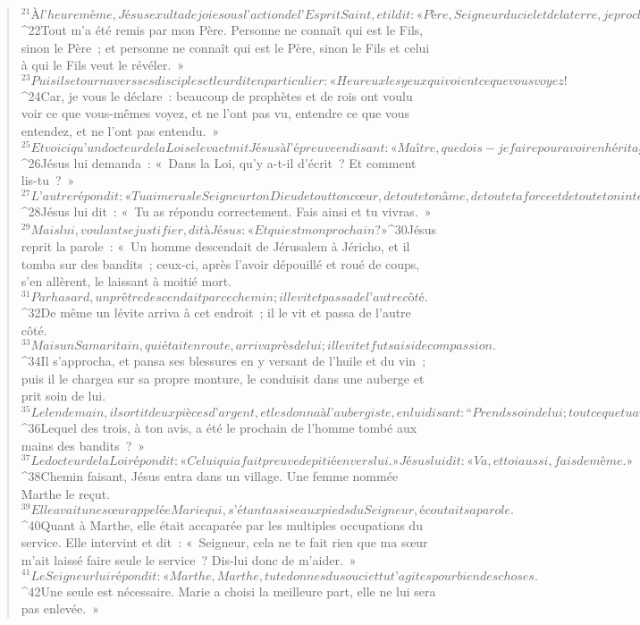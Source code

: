 \begin{verse}
${}^{21}À l’heure même, Jésus exulta de joie sous l’action de l’Esprit Saint, et il dit : « Père, Seigneur du ciel et de la terre, je proclame ta louange : ce que tu as caché aux sages et aux savants, tu l’as révélé aux tout-petits. Oui, Père, tu l’as voulu ainsi dans ta bienveillance. 
${}^{22}Tout m’a été remis par mon Père. Personne ne connaît qui est le Fils, sinon le Père ; et personne ne connaît qui est le Père, sinon le Fils et celui à qui le Fils veut le révéler. »
${}^{23}Puis il se tourna vers ses disciples et leur dit en particulier : « Heureux les yeux qui voient ce que vous voyez ! 
${}^{24}Car, je vous le déclare : beaucoup de prophètes et de rois ont voulu voir ce que vous-mêmes voyez, et ne l’ont pas vu, entendre ce que vous entendez, et ne l’ont pas entendu. »
${}^{25}Et voici qu’un docteur de la Loi se leva et mit Jésus à l’épreuve en disant : « Maître, que dois-je faire pour avoir en héritage la vie éternelle ? » 
${}^{26}Jésus lui demanda : « Dans la Loi, qu’y a-t-il d’écrit ? Et comment lis-tu ? » 
${}^{27}L’autre répondit : « Tu aimeras le Seigneur ton Dieu de tout ton cœur, de toute ton âme, de toute ta force et de toute ton intelligence, et ton prochain comme toi-même. »
${}^{28}Jésus lui dit : « Tu as répondu correctement. Fais ainsi et tu vivras. »
${}^{29}Mais lui, voulant se justifier, dit à Jésus : « Et qui est mon prochain ? »
${}^{30}Jésus reprit la parole : « Un homme descendait de Jérusalem à Jéricho, et il tomba sur des bandits ; ceux-ci, après l’avoir dépouillé et roué de coups, s’en allèrent, le laissant à moitié mort. 
${}^{31}Par hasard, un prêtre descendait par ce chemin ; il le vit et passa de l’autre côté. 
${}^{32}De même un lévite arriva à cet endroit ; il le vit et passa de l’autre côté. 
${}^{33}Mais un Samaritain, qui était en route, arriva près de lui ; il le vit et fut saisi de compassion. 
${}^{34}Il s’approcha, et pansa ses blessures en y versant de l’huile et du vin ; puis il le chargea sur sa propre monture, le conduisit dans une auberge et prit soin de lui. 
${}^{35}Le lendemain, il sortit deux pièces d’argent, et les donna à l’aubergiste, en lui disant : “Prends soin de lui ; tout ce que tu auras dépensé en plus, je te le rendrai quand je repasserai.” 
${}^{36}Lequel des trois, à ton avis, a été le prochain de l’homme tombé aux mains des bandits ? » 
${}^{37}Le docteur de la Loi répondit : « Celui qui a fait preuve de pitié envers lui. » Jésus lui dit : « Va, et toi aussi, fais de même. »
${}^{38}Chemin faisant, Jésus entra dans un village. Une femme nommée Marthe le reçut. 
${}^{39}Elle avait une sœur appelée Marie qui, s’étant assise aux pieds du Seigneur, écoutait sa parole. 
${}^{40}Quant à Marthe, elle était accaparée par les multiples occupations du service. Elle intervint et dit : « Seigneur, cela ne te fait rien que ma sœur m’ait laissé faire seule le service ? Dis-lui donc de m’aider. » 
${}^{41}Le Seigneur lui répondit : « Marthe, Marthe, tu te donnes du souci et tu t’agites pour bien des choses. 
${}^{42}Une seule est nécessaire. Marie a choisi la meilleure part, elle ne lui sera pas enlevée. »
      

\end{verse}
